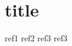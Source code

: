 \documentclass[a4paper,12pt,french]{article}
\begin{document}
	
	\section{title}
	
	ref1 \cite{ref1}
	ref2 \cite{ref2}
	ref3 \cite{ref3} 
	ref3 \cite{ref4}
	
	\begin{framed}
		\allsectionsfont{\centering\normalfont\large\scshape}
		\renewcommand\bibname{Références}
		
		
	\end{framed}
\end{document}
